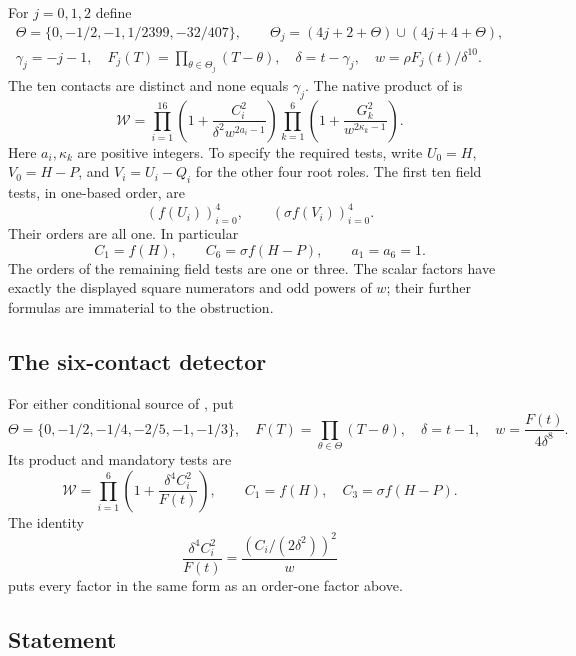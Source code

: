 \documentclass[11pt,a4paper]{article}
\theoremstyle{remark}\newtheorem{remark}[theorem]{Remark}
\begin{document}
For $j=0,1,2$ define
\[
\begin{gathered}
 \Theta=\{0,-1/2,-1,1/2399,-32/407\},\qquad
 \Theta_j=(4j+2+\Theta)\cup(4j+4+\Theta),\\
 \gamma_j=-j-1,\quad
 F_j(T)=\prod_{\theta\in\Theta_j}(T-\theta),\quad
 \delta=t-\gamma_j,\quad w=\rho F_j(t)/\delta^{10}.
\end{gathered}
\]
The ten contacts are distinct and none equals $\gamma_j$.
The native product of \cite[Section~3]{UnitNorm} is
\begin{equation}\label{eq:general}
 \mathcal W=
 \prod_{i=1}^{16}\left(1+\frac{C_i^2}{\delta^2w^{2a_i-1}}\right)
 \prod_{k=1}^{6}\left(1+\frac{G_k^2}{w^{2\kappa_k-1}}\right).
\end{equation}
Here $a_i,\kappa_k$ are positive integers. To specify the required
tests, write $U_0=H$, $V_0=H-P$, and $V_i=U_i-Q_i$ for the other
four root roles. The first ten field tests, in one-based order, are
\[
 (f(U_i))_{i=0}^4,\qquad (\sigma f(V_i))_{i=0}^4.
\]
Their orders are all one. In particular
\begin{equation}\label{eq:mandatory}
             C_1=f(H),\qquad C_6=\sigma f(H-P),
             \qquad a_1=a_6=1.
\end{equation}
The orders of the remaining field tests are one or three. The scalar
factors have exactly the displayed square numerators and odd powers
of $w$; their further formulas are immaterial to the obstruction.

\subsection{The six-contact detector}

For either conditional source of \cite[Section~3]{UnitNorm}, put
\[
 \Theta=\{0,-1/2,-1/4,-2/5,-1,-1/3\},\quad
 F(T)=\prod_{\theta\in\Theta}(T-\theta),\quad
 \delta=t-1,\quad w=\frac{F(t)}{4\delta^8}.
\]
Its product and mandatory tests are
\begin{equation}\label{eq:conditional}
 \mathcal W=\prod_{i=1}^6\left(1+\frac{\delta^4C_i^2}{F(t)}\right),
 \qquad C_1=f(H),\quad C_3=\sigma f(H-P).
\end{equation}
The identity
\[
       \frac{\delta^4C_i^2}{F(t)}
                   =\frac{(C_i/(2\delta^2))^2}{w}
\]
puts every factor in the same form as an order-one factor above.

\subsection{Statement}
\end{document}

